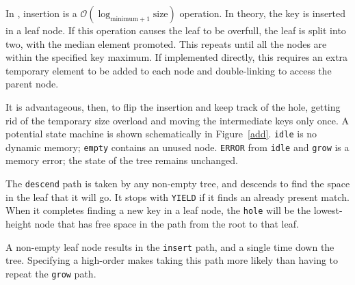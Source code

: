 \documentclass[12pt]{article}
\newcommand{\code}[1]{\colorbox{light-gray}{\texttt{#1}}}
\begin{document}
In \cite{bayer1972organization, knuth1998sorting, comer1979ubiquitous}, insertion is a $\mathcal{O}(\log_{\text{minimum}+1} \text{size})$ operation. In theory, the key is inserted in a leaf node. If this operation causes the leaf to be overfull, the leaf is split into two, with the median element promoted. This repeats until all the nodes are within the specified key maximum. If implemented directly, this requires an extra temporary element to be added to each node and double-linking to access the parent node.

It is advantageous, then, to flip the insertion and keep track of the hole, getting rid of the temporary size overload and moving the intermediate keys only once. A potential state machine is shown schematically in Figure~\ref{add}. \code{idle} is no dynamic memory; \code{empty} contains an unused node. \code{ERROR} from \code{idle} and \code{grow} is a memory error; the state of the tree remains unchanged.

The \code{descend} path is taken by any non-empty tree, and descends to find the space in the leaf that it will go. It stops with \code{YIELD} if it finds an already present match. When it completes finding a new key in a leaf node, the \code{hole} will be the lowest-height node that has free space in the path from the root to that leaf.

A non-empty leaf node results in the \code{insert} path, and a single time down the tree. Specifying a high-order makes taking this path more likely than having to repeat the \code{grow} path.
\end{document}
